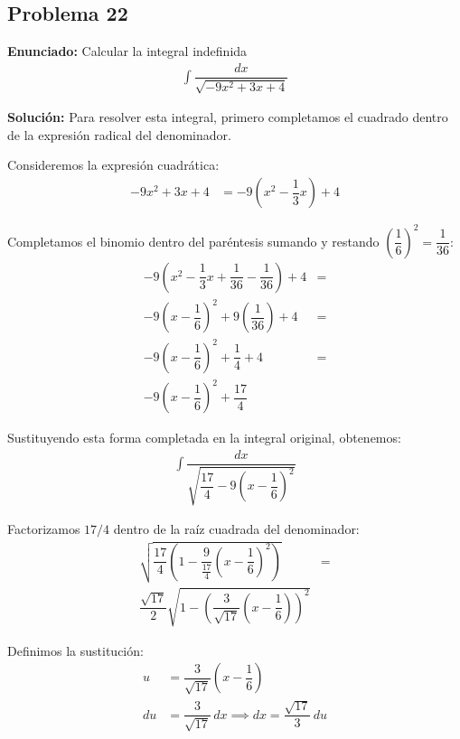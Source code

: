 \subsection*{Problema 22}

\textbf{Enunciado:} Calcular la integral indefinida
\begin{align*}
\int \dfrac{dx}{\sqrt{-9x^2 + 3x + 4}}
\end{align*}

\textbf{Solución:} Para resolver esta integral, primero completamos el cuadrado dentro de la expresión radical del denominador.

Consideremos la expresión cuadrática:
\begin{align*}
-9x^2 + 3x + 4 &= -9\left(x^2 - \dfrac{1}{3}x\right) + 4
\end{align*}

Completamos el binomio dentro del paréntesis sumando y restando $\left(\dfrac{1}{6}\right)^2 = \dfrac{1}{36}$:
\begin{align*}
-9\left(x^2 - \dfrac{1}{3}x + \dfrac{1}{36} - \dfrac{1}{36}\right) + 4 &= \\
-9\left(x - \dfrac{1}{6}\right)^2 + 9\left(\dfrac{1}{36}\right) + 4 &= \\
-9\left(x - \dfrac{1}{6}\right)^2 + \dfrac{1}{4} + 4 &= \\
-9\left(x - \dfrac{1}{6}\right)^2 + \dfrac{17}{4}
\end{align*}

Sustituyendo esta forma completada en la integral original, obtenemos:
\begin{align*}
\int \dfrac{dx}{\sqrt{\dfrac{17}{4} - 9\left(x - \dfrac{1}{6}\right)^2}}
\end{align*}

Factorizamos $17/4$ dentro de la raíz cuadrada del denominador:
\begin{align*}
\sqrt{\dfrac{17}{4}\left(1 - \dfrac{9}{\frac{17}{4}}\left(x - \dfrac{1}{6}\right)^2\right)} &= \\
\dfrac{\sqrt{17}}{2} \sqrt{1 - \left(\dfrac{3}{\sqrt{17}}\left(x - \dfrac{1}{6}\right)\right)^2}
\end{align*}

Definimos la sustitución:
\begin{align*}
u &= \dfrac{3}{\sqrt{17}}\left(x - \dfrac{1}{6}\right) \\
du &= \dfrac{3}{\sqrt{17}} \, dx \implies dx = \dfrac{\sqrt{17}}{3} \, du
\end{align*}


